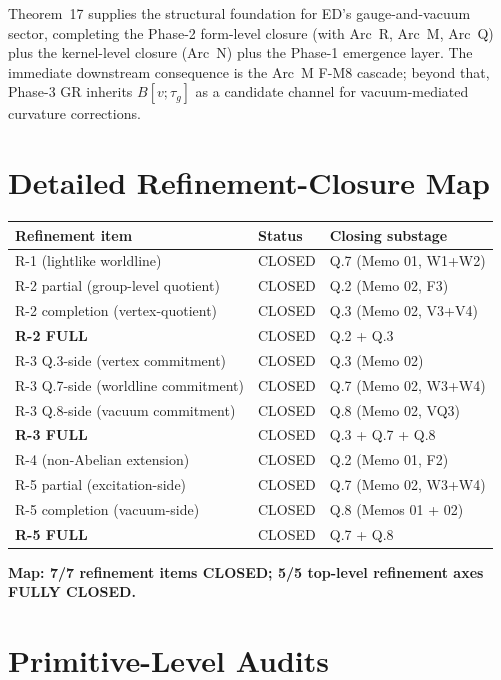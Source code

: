\documentclass[11pt,a4paper]{article}
\begin{document}
Theorem~17 supplies the structural foundation for ED's gauge-and-vacuum sector, completing the Phase-2 form-level closure (with Arc~R, Arc~M, Arc~Q) plus the kernel-level closure (Arc~N) plus the Phase-1 emergence layer. The immediate downstream consequence is the Arc~M F-M8 cascade; beyond that, Phase-3 GR inherits $B[v;\tau_g]$ as a candidate channel for vacuum-mediated curvature corrections.

\appendix

\section{Detailed Refinement-Closure Map}

\begin{center}
\begin{tabular}{lll}
\toprule
\textbf{Refinement item} & \textbf{Status} & \textbf{Closing substage} \\
\midrule
R-1 (lightlike worldline) & CLOSED & Q.7 (Memo 01, W1+W2) \\
R-2 partial (group-level quotient) & CLOSED & Q.2 (Memo 02, F3) \\
R-2 completion (vertex-quotient) & CLOSED & Q.3 (Memo 02, V3+V4) \\
\textbf{R-2 FULL} & CLOSED & Q.2 + Q.3 \\
R-3 Q.3-side (vertex commitment) & CLOSED & Q.3 (Memo 02) \\
R-3 Q.7-side (worldline commitment) & CLOSED & Q.7 (Memo 02, W3+W4) \\
R-3 Q.8-side (vacuum commitment) & CLOSED & Q.8 (Memo 02, VQ3) \\
\textbf{R-3 FULL} & CLOSED & Q.3 + Q.7 + Q.8 \\
R-4 (non-Abelian extension) & CLOSED & Q.2 (Memo 01, F2) \\
R-5 partial (excitation-side) & CLOSED & Q.7 (Memo 02, W3+W4) \\
R-5 completion (vacuum-side) & CLOSED & Q.8 (Memos 01 + 02) \\
\textbf{R-5 FULL} & CLOSED & Q.7 + Q.8 \\
\bottomrule
\end{tabular}
\end{center}

\noindent \textbf{Map: 7/7 refinement items CLOSED; 5/5 top-level refinement axes FULLY CLOSED.}

\section{Primitive-Level Audits}
\end{document}
